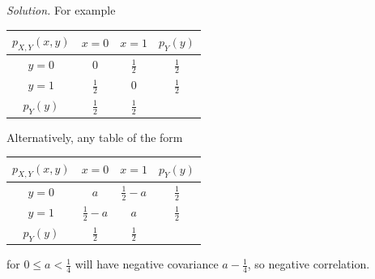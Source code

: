 \documentclass[
  a4paper,
]{book}
\theoremstyle{definition}
\theoremstyle{definition}
\theoremstyle{definition}
\theoremstyle{definition}
\theoremstyle{remark}
\begin{document}
\begin{myanswers}
\emph{Solution.} For example

\begin{longtable}[]{@{}cccc@{}}
\toprule()
\(p_{X,Y}(x,y)\) & \(x = 0\) & \(x = 1\) & \(p_Y(y)\) \\
\midrule()
\endhead
\(y = 0\) & \(0\) & \(\frac12\) & \(\frac12\) \\
\(y = 1\) & \(\frac12\) & \(0\) & \(\frac12\) \\
\(p_Y(y)\) & \(\frac12\) & \(\frac12\) & \\
\bottomrule()
\end{longtable}

Alternatively, any table of the form

\begin{longtable}[]{@{}cccc@{}}
\toprule()
\(p_{X,Y}(x,y)\) & \(x = 0\) & \(x = 1\) & \(p_Y(y)\) \\
\midrule()
\endhead
\(y = 0\) & \(a\) & \(\frac12 - a\) & \(\frac12\) \\
\(y = 1\) & \(\frac12 - a\) & \(a\) & \(\frac12\) \\
\(p_Y(y)\) & \(\frac12\) & \(\frac12\) & \\
\bottomrule()
\end{longtable}

for \(0 \leq a < \frac14\) will have negative covariance \(a - \frac14\), so negative correlation.

\end{myanswers}
\end{document}
